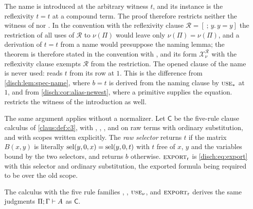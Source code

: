 \begin{remark}
\label{wit:rem:x-uses}
The name is introduced at the arbitrary witness $t$, and its instance is the
reflexivity $t=t$ at a compound term.  The proof therefore restricts neither
the witness of  nor .  In the convention with
the reflexivity clause $\mathcal R=[\ ;\,y.\,y=y]$ the restriction of all
uses of $\mathcal R$ to $\nu(\Pi)$ would leave only $\nu(\Pi)=\nu(\Pi)$, and
a derivation of $t=t$ from a name would presuppose the naming lemma; the
theorem is therefore stated in the convention with , and its
form $\mathcal X^{\mathcal R}_\nu$ with the reflexivity clause exempts
$\mathcal R$ from the restriction.  The opened clause of the name is never
used:  reads $t$ from its row at $1$.  This is the
difference from \cref{disch:lem:spec-name}, where $b=t$ is derived from the
naming clause by $\rulename{Use}_{*}$ at $1$, and from
\cref{disch:cor:alias-newest}, where a primitive  supplies
the equation.   restricts the witness of the introduction
as well.
\end{remark}

The same argument applies without a normalizer.  Let $\mathsf{C}$ be the
five-rule clause calculus of \cref{claus:def:c3}, with ,
, ,  and  on raw
terms with ordinary substitution, and with scopes written explicitly.  The
\emph{raw selector} returns $t$ if the matrix $B(x,y)$ is literally
$\operatorname{sel}(y,0,x)=\operatorname{sel}(y,0,t)$ with $t$ free of $x$, $y$ and the variables bound
by the two selectors, and returns $b$ otherwise.  $\rulename{Export}_{\mathrm r}$
is \eqref{disch:eq:export} with this selector and ordinary substitution,
the exported formula being required to be over the old scope.

\begin{proposition}
\label{wit:prop:x-raw}
The calculus with the five rule families , ,
$\rulename{Use}_\nu$,  and $\rulename{Export}_{\mathrm r}$
derives the same judgments $\Pi;\Gamma\vdash A$ as $\mathsf{C}$.
\end{proposition}

